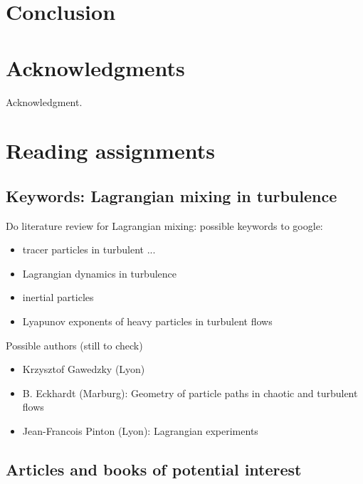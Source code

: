 \documentclass[letter,10pt,openany]{article}
\begin{document}
  

 







\section{Conclusion}
\label{sec:conclusion}


\section{Acknowledgments}
Acknowledgment. 











\section{Reading assignments}
\label{sect:Reading}


\subsection{Keywords: Lagrangian mixing in turbulence}

Do literature review for Lagrangian mixing: possible keywords
to google:
\begin{itemize}
\item
    tracer particles in turbulent ...
\item
    Lagrangian dynamics in turbulence
\item
    inertial particles
\item
    Lyapunov exponents of heavy particles in turbulent flows
\end{itemize}

Possible authors (still to check)
\begin{itemize}
\item
Krzysztof Gawedzky (Lyon)
\item
    B. Eckhardt (Marburg):
Geometry of particle paths in chaotic and turbulent flows
\item
    Jean-Francois Pinton (Lyon): Lagrangian experiments
\end{itemize}


\subsection{Articles and books of potential interest}
\end{document}

